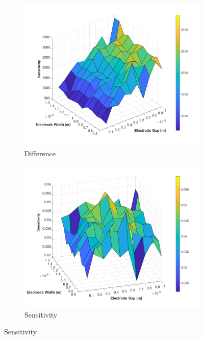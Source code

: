 \begin{figure}[h]
    \centering
    \begin{subfigure}[b]{0.49\textwidth}
        \centering
        \includegraphics[width=\textwidth]{images/comsol_device_surface_difference.png}
        \caption{Difference}
    \end{subfigure}
    \hfill
    \begin{subfigure}[b]{0.49\textwidth}
        \centering
        \includegraphics[width=\textwidth]{images/comsol_device_surface_sensitivity.png}
        \caption{Sensitivity}
        \label{fig:device_sensitivity_curve}

\end{subfigure}
\end{figure}
